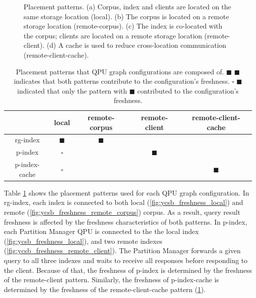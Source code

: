 \begin{figure}[H]
\begin{subfigure}{0.24\textwidth}
    \caption{}
    \label{fig:ycsb_freshness_remote_client_cache}
  \end{subfigure}%
  \caption{Placement patterns. (a) Corpus, index and clients are located on the same storage location (local).
  (b) The corpus is located on a remote storage location (remote-corpus). (c) The index is co-located with the corpus;
  clients are located on a remote storage location (remote-client). (d) A cache is used to reduce cross-location communication (remote-client-cache).}
  \label{fig:placement_patterns}
\end{figure}

\begin{table}[H]
\centering
\begin{tabular}{|c||c|c|c|c||}
\hline
& local & remote-corpus & remote-client & remote-client-cache \\
\hline
rg-index & $\blacksquare$ & $\blacksquare$ &  & \\
\hline
p-index & $\square$ & & $\blacksquare$ & \\
\hline
p-index-cache & $\square$ & &  & $\blacksquare$ \\
\hline
\end{tabular}
\caption{Placement patterns that QPU graph configurations are composed of.
$\blacksquare$ $\blacksquare$ indicates that both patterns contribute to the configuration's freshness.
$\square$ $\blacksquare$ indicated that only the pattern with $\blacksquare$ contributed to the configuration's freshness.}
\label{tab:placement_patterns}
\end{table}

Table \ref{tab:placement_patterns} shows the placement patterns used for each QPU graph configuration.
In rg-index, each index is connected to both local (\ref{fig:ycsb_freshness_local}) and remote (\ref{fig:ycsb_freshness_remote_corpus}) corpus.
As a result, query result freshness is affected by the freshness characteristics of both patterns.
In p-index, each Partition Manager QPU is connected to the the local index (\ref{fig:ycsb_freshness_local}),
and two remote indexes (\ref{fig:ycsb_freshness_remote_client}).
The Partition Manager forwards a given query to all three indexes and waits to receive all responses before responding to
the client.
Because of that, the freshness of p-index is determined by the freshness of the remote-client pattern.
Similarly, the freshness of p-index-cache is determined by the freshness of the remote-client-cache pattern
(\ref{fig:ycsb_freshness_remote_client_cache}).

